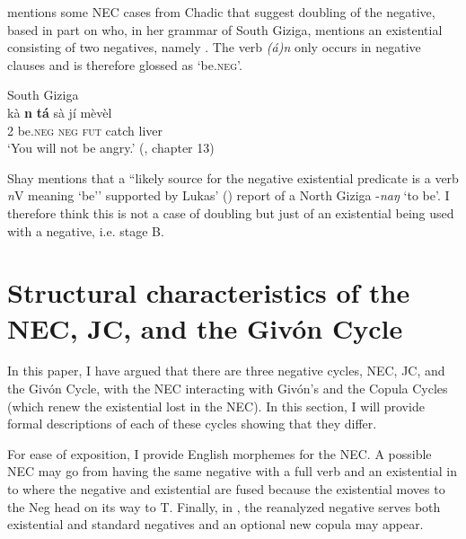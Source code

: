 \documentclass[output=paper,draft,draftmode,colorlinks,citecolor=brown]{langscibook}
\begin{document}
\citet{chapters/Chadic-Butters} mentions some NEC cases from Chadic that suggest
doubling of the negative, based in part on \citet{Shay2008} who, in her
grammar of South Giziga, mentions an existential consisting of two
negatives, namely . The verb \textit{(á)n} only occurs in
negative clauses and is therefore glossed as `be.\textsc{neg}'.
%
\begin{exe}\ex South Giziga \label{ex:other-giziga-angry}\\
    \gll kà  \textbf{n}  \textbf{tá}  sà  jí  mèvèl      \\
2  be.\textsc{neg}  \textsc{neg}  \textsc{fut}  catch  liver \\
    \glt
‘You will not be angry.' (\citealt{Shay2008}, chapter 13)
    \end{exe}
%
Shay mentions that a ``likely source for the negative existential predicate
is a verb \textit{n}V meaning `be'' supported by Lukas' (\citeyear[151]{Lukas1970}) report of a
North Giziga -\textit{naŋ} `to be'. I therefore think this is not a case of
doubling but just of an existential being used with a negative, i.e. stage
B.

\section{Structural characteristics of the NEC, JC, and the Givón
Cycle}\label{sec:oth-5}

In this paper, I have argued that there are three negative cycles, NEC, JC, and the Givón Cycle, with the NEC interacting with Givón's and the Copula Cycles (which renew the existential lost in the NEC). In this section, I will provide formal descriptions of each of these cycles showing that they differ.

For ease of exposition, I provide English morphemes for the NEC. A
possible NEC may go from having the same negative with a full verb and an
existential in  to  where the negative
and existential are fused because the existential moves to the Neg head
on its way to T. Finally, in , the reanalyzed negative
serves both existential and standard negatives and an optional new copula
may appear.
\pagebreak


\end{document}
